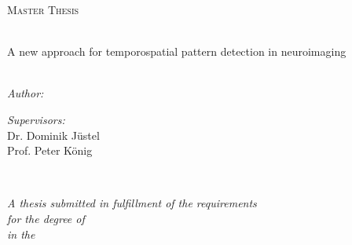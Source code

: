 \documentclass[
11pt, %
english, %
singlespacing, %
headsepline, %
]{MastersDoctoralThesis} %
\author{Michael \textsc{Gerstenberger}} %
\begin{document}
\frontmatter %

\pagestyle{plain} %


\begin{titlepage}
\begin{center}

\vspace*{.06\textheight}
{\scshape\LARGE \univname\par}\vspace{1.5cm} %
\textsc{\Large Master Thesis}\\[0.5cm] %

\HRule \\[0.4cm] %
{\fontsize{16}{18}\selectfont \bfseries \ttitle\par}\vspace{0.4cm}%
{\fontsize{11}{10}\selectfont  A new approach for temporospatial pattern detection in neuroimaging}%
\\
\HRule \\[1.5cm] %
 
\begin{minipage}[t]{0.4\textwidth}
\begin{flushleft} \large
\emph{Author:}\\
{\authorname} %
\end{flushleft}
\end{minipage}
\begin{minipage}[t]{0.4\textwidth}
\begin{flushright} \large
\emph{Supervisors:} \\
Dr. Dominik Jüstel
\\Prof. Peter König
\end{flushright}
\end{minipage}\\[2cm]
 
\vfill

\large \textit{A thesis submitted in fulfillment of the requirements\\ for the degree of \degreename}\\[0.3cm] %
\textit{in the}\\[0.4cm]
\groupname\\\deptname\\[2cm] %
 

\end{center}
\end{titlepage}
\end{document}
